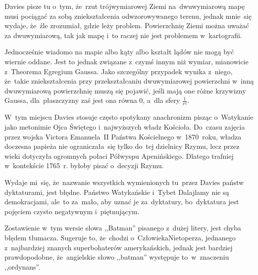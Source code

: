 \documentclass[a4paper,11pt]{article}
\begin{document}
\vspace{\spaceTwo}








\start {} Davies pisze tu o~tym, że~rzut trójwymiarowej Ziemi
na~dwuwymiarową mapę musi pociągać za sobą zniekształcenia
odwzorowywanego terenu, jednak mnie~się wydaje, że~źle zrozumiał,
gdzie leży problem. Powierzchnię Ziemi można uważać za dwuwymiarową,
tak jak mapę i~to raczej nie jest problemem w~kartografii.

Jednocześnie wiadomo na mapie albo kąty albo kształt lądów nie mogą
być wiernie oddane. Jest to jednak związane z~czymś innym niż wymiar,
mianowicie z~Theorema Egregium Gaussa. Jako szczególny przypadek
wynika z~niego, że~takie zniekształcenia przy przekształcaniu
dwuwymiarowej powierzchni w~inną dwuwymiarową powierzchnię muszą się
pojawić, jeśli mają one różne krzywizny Gaussa, dla~płaszczyzny zaś
jest ona równa 0, a~dla sfery $\frac{ 1 }{ r^{ 2 } }$.

\vspace{\spaceFour}


\start {} W~tym miejscu Davies stosuje często spotykany
anachronizm pisząc o~Watykanie jako metonimie Ojca Świętego
i~najwyższych władz Kościoła. Do~czasu zajęcia przez wojska Victora
Emanuela~II Państwa Kościelnego w~1870~roku, władza doczesna papieża
nie ograniczała~się tylko do~tej dzielnicy Rzymu, lecz przez wieki
dotyczyła ogromnych połaci Półwyspu Apenińskiego. Dlatego trafniej
w~kontekście 1765~r. byłoby pisać o~decyzji Rzymu.

\vspace{\spaceFour}


\start {} Wydaje mi~się, że~nazwanie wszystkich wymienionych
tu~przez Davies państw dyktaturami, jest błędne. Państwo Watykańskie
i~Tybet Dalajlamy nie są demokracjami, ale~to za~mało, aby uznać je
za~dyktatury, bo~dyktatura jest pojęciem czysto negatywnym
i~piętnującym.

\vspace{\spaceFour}


\start {} Zostawienie w~tym wersie słowa ,,Batman''
pisanego z~dużej litery, jest chyba błędem tłumacza. Sugeruje to,
że~chodzi o~Człowieka\dywiz Nietoperza, jednanego z~najbardziej
znanych superbohaterów amerykańskich, jednak jest bardziej
prawdopodobne, że~angielskie słowo ,,batman'' występuje to~w~znaczeniu
,,ordynans''.
\end{document}
